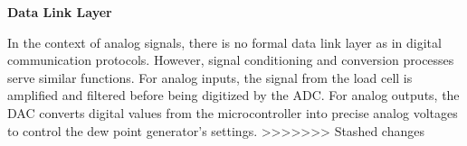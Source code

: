 \textbf{Data Link Layer}

In the context of analog signals, there is no formal data link layer as in digital communication protocols. 
However, signal conditioning and conversion processes serve similar functions. For analog inputs, the signal 
from the load cell is amplified and filtered before being digitized by the ADC. For analog outputs, the DAC 
converts digital values from the microcontroller into precise analog voltages to control the dew point 
generator's settings.
>>>>>>> Stashed changes

